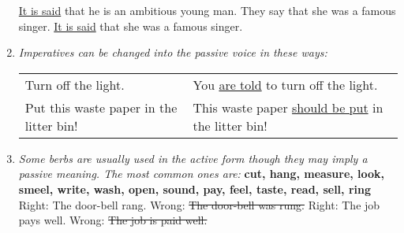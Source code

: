 \begin{enumerate}
        \underline{It is said} that he is an ambitious young man.
        \newline
        \newline
        They say that she was a famous singer.
        \newline
        \underline{It is said} that she was a famous singer.
    \item
        {\it
        Imperatives can be changed into the passive voice in these ways:
        }
        \newline
        \begin{tabular}{ll}
            Turn off the light.
            & You \underline{are told} to turn off the light.
            \\
            Put this waste paper in the litter bin!
            & This waste paper \underline{should be put} in the litter bin!
        \end{tabular}
    \item
        {\it
        Some berbs are usually used in the active form though they may imply a
        passive meaning. The most common ones are:
        }
        \newline
        \newline
        {\bf cut, hang, measure, look, smeel, write, wash, open, sound, pay,
        feel, taste, read, sell, ring}
        \newline
        \newline
        Right: The door-bell rang.
        \newline
        Wrong: \st{The door-bell was rung.}
        \newline
        \newline
        Right: The job pays well.
        \newline
        Wrong: \st{The job is paid well.}
\end{enumerate}
